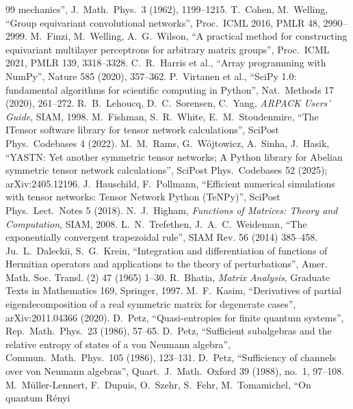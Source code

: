 \documentclass[11pt]{article}
\begin{document}
{\begin{thebibliography}{99}
  mechanics'', J.\ Math.\ Phys.\ 3 (1962), 1199--1215.
 T.~Cohen, M.~Welling, ``Group equivariant convolutional networks'', Proc.\ ICML 2016, PMLR 48,
  2990--2999.
 M.~Finzi, M.~Welling, A.~G.~Wilson, ``A practical method for constructing equivariant multilayer
  perceptrons for arbitrary matrix groups'', Proc.\ ICML 2021, PMLR 139, 3318--3328.
 C.~R.~Harris et al., ``Array programming with NumPy'', Nature 585 (2020), 357--362.
 P.~Virtanen et al., ``SciPy 1.0: fundamental algorithms for scientific computing in Python'',
  Nat.\ Methods 17 (2020), 261--272.
 R.~B.~Lehoucq, D.~C.~Sorensen, C.~Yang, \emph{ARPACK Users' Guide}, SIAM, 1998.
 M.~Fishman, S.~R.~White, E.~M.~Stoudenmire, ``The ITensor software library for tensor network
  calculations'', SciPost Phys.\ Codebases 4 (2022).
 M.~M.~Rams, G.~W\'ojtowicz, A.~Sinha, J.~Hasik, ``YASTN: Yet another symmetric tensor networks; A
  Python library for Abelian symmetric tensor network calculations'', SciPost Phys.\ Codebases 52 (2025);
  arXiv:2405.12196.
 J.~Hauschild, F.~Pollmann, ``Efficient numerical simulations with tensor networks: Tensor
  Network Python (TeNPy)'', SciPost Phys.\ Lect.\ Notes 5 (2018).
 N.~J.~Higham, \emph{Functions of Matrices: Theory and Computation}, SIAM, 2008.
 L.~N.~Trefethen, J.~A.~C.~Weideman, ``The exponentially convergent trapezoidal rule'',
SIAM Rev. 56 (2014) 385--458.
 Ju.~L.~Daleckii, S.~G.~Krein, ``Integration and differentiation of functions of Hermitian
operators and applications to the theory of perturbations'', Amer. Math. Soc. Transl. (2) 47 (1965) 1--30.
 R.~Bhatia, \emph{Matrix Analysis}, Graduate Texts in Mathematics 169, Springer, 1997.
 M.~F.~Kasim, ``Derivatives of partial eigendecomposition of a real symmetric matrix for
degenerate cases'', arXiv:2011.04366 (2020).
 D.~Petz, ``Quasi-entropies for finite quantum systems'', Rep.\ Math.\ Phys.\ 23 (1986), 57--65.
 D.~Petz, ``Sufficient subalgebras and the relative entropy of states of a von Neumann
  algebra'', Commun.\ Math.\ Phys.\ 105 (1986), 123--131.
 D.~Petz, ``Sufficiency of channels over von Neumann algebras'', Quart.\ J.\ Math.\ Oxford 39
  (1988), no.~1, 97--108.
 M.~M\"uller-Lennert, F.~Dupuis, O.~Szehr, S.~Fehr, M.~Tomamichel, ``On quantum R\'enyi

\end{thebibliography}}
\end{document}
